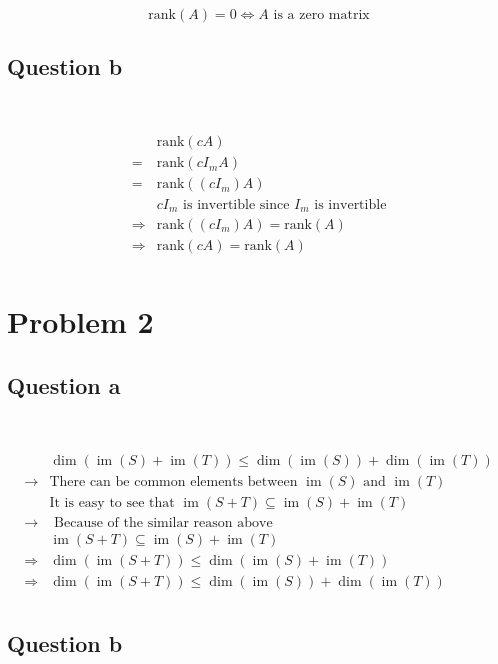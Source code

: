 \documentclass{article}
\def\rank{\text{rank}}
\DeclareMathOperator{\im}{im}
\begin{document}
~

$$
\rank(A)=0\iff A\text{ is a zero matrix}
$$

\subsection{Question b}

~

\begin{equation*}
\begin{split}
&\rank(cA)\\
=&\rank(cI_mA)\\
=&\rank((cI_m)A)\\
&cI_m\text{ is invertible since }I_m\text{ is invertible}\\
\Rightarrow&\rank((cI_m)A)=\rank(A)\\
\Rightarrow&\rank(cA)=\rank(A)\\
\end{split}
\end{equation*}

\newpage

\section{Problem 2}

\subsection{Question a}

~

\begin{equation*}
\begin{split}
&\dim(\im(S)+\im(T))\leq\dim(\im(S))+\dim(\im(T))\\
\rightarrow&\text{There can be common elements between }\im(S)\text{ and }\im(T)\\
&\text{It is easy to see that }\im(S+T)\subseteq\im(S)+\im(T)\\
\rightarrow&\text{ Because of the similar reason above}\\
&\im(S+T)\subseteq\im(S)+\im(T)\\
\Rightarrow &\dim(\im(S+T))\leq\dim(\im(S)+\im(T))\\
\Rightarrow&\dim(\im(S+T))\leq\dim(\im(S))+\dim(\im(T))\\
\end{split}
\end{equation*}

\subsection{Question b}
\end{document}

